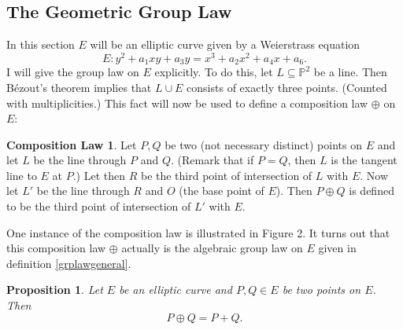 \documentclass{article}
\numberwithin{equation}{section}
\newtheorem{proposition}[theorem]{Proposition}
\theoremstyle{definition}
\newtheorem{compositionlaw}[theorem]{Composition Law}
\newcommand{\proj}[1]{{\mathbb P}^{#1}} %
\begin{document}
\subsection{The Geometric Group Law}\label{geometricgrlaw} 
In this section $E$ will be an elliptic curve given by a Weierstrass equation $$E:y^2+a_1xy+a_3y=x^3+a_2x^2+a_4x+a_6.$$ I will give the group law on $E$ explicitly. To do this, let $L \subseteq \proj{2}$ be a line. Then B\'ezout's theorem \cite[I.7.8.]{Hartshorne} implies that $L\cup E$ consists of exactly three points. (Counted with multiplicities.) This fact will now be used to define a composition law $\oplus$ on $E$:

\begin{compositionlaw} \label{composition}
Let $P,Q$ be two (not necessary distinct) points on $E$ and let $L$ be the line through $P$ and $Q$. (Remark that if $P=Q$, then $L$ is the tangent line to $E$ at $P$.) Let then $R$ be the third point of intersection of $L$ with $E$. Now let $L'$ be the line through $R$ and $O$ (the base point of $E$). Then $P\oplus Q$ is defined to be the third point of intersection of $L'$ with $E$.
\end{compositionlaw}

One instance of the composition law is illustrated in Figure 2. It turns out that this composition law $\oplus$ actually is the algebraic group law on $E$ given in definition \ref{grplawgeneral}.

\begin{proposition}\label{grplawsaresame}
Let $E$ be an elliptic curve and $P,Q\in E$ be two points on $E$. Then $$P \oplus Q = P+Q.$$ 
\end{proposition}
\end{document}
